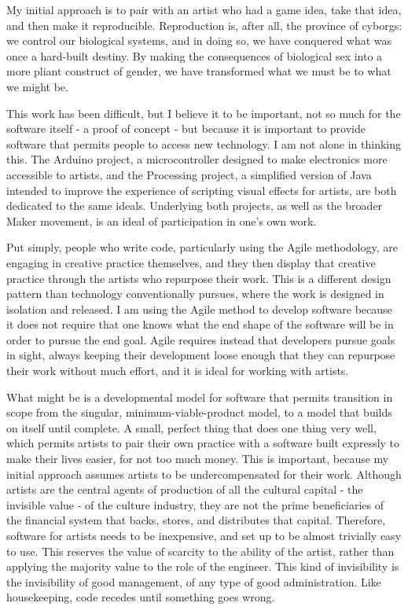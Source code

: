 My initial approach is to pair with an artist who had a game idea, take that idea, and then make it reproducible. Reproduction is, after all, the province of cyborgs: we control our biological systems, and in doing so, we have conquered what was once a hard-built destiny. By making the consequences of biological sex into a more pliant construct of gender, we have transformed what we must be to what we might be.

This work has been difficult, but I believe it to be important, not so much for the software itself - a proof of concept - but because it is important to provide software that permits people to access new technology. I am not alone in thinking this. The Arduino project, a microcontroller designed to make electronics more accessible to artists, and the Processing project, a simplified version of Java intended to improve the experience of scripting visual effects for artists, are both dedicated to the same ideals. Underlying both projects, as well as the broader Maker movement, is an ideal of participation in one’s own work.

Put simply, people who write code, particularly using the Agile methodology, are engaging in creative practice themselves, and they then display that creative practice through the artists who repurpose their work. This is a different design pattern than technology conventionally pursues, where the work is designed in isolation and released. I am using the Agile method to develop software because it does not require that one knows what the end shape of the software will be in order to pursue the end goal. Agile requires instead that developers pursue goals in sight, always keeping their development loose enough that they can repurpose their work without much effort, and it is ideal for working with artists.

What might be is a developmental model for software that permits transition in scope from the singular, minimum-viable-product model, to a model that builds on itself until complete. A small, perfect thing that does one thing very well, which permits artists to pair their own practice with a software built expressly to make their lives easier, for not too much money. This is important, because my initial approach assumes artists to be undercompensated for their work. Although artists are the central agents of production of all the cultural capital - the invisible value - of the culture industry, they are not the prime beneficiaries of the financial system that backs, stores, and distributes that capital. Therefore, software for artists needs to be inexpensive, and set up to be almost trivially easy to use. This reserves the value of scarcity to the ability of the artist, rather than applying the majority value to the role of the engineer. This kind of invisibility is the invisibility of good management, of any type of good administration. Like housekeeping, code recedes until something goes wrong.

